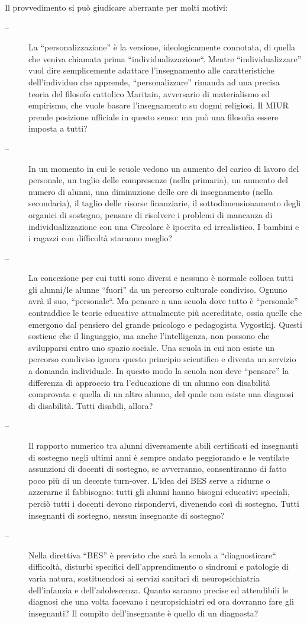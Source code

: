 Il provvedimento si può giudicare aberrante per molti motivi:
\begin{description}
\item[--]  La “personalizzazione” è la versione, ideologicamente connotata, di quella che veniva chiamata prima “individualizzazione“. Mentre “individualizzare” vuol dire semplicemente adattare l'insegnamento alle caratteristiche dell'individuo che apprende, “personalizzare” rimanda ad una precisa teoria del filosofo cattolico Maritain, avversario di materialismo ed empirismo, che vuole basare l'insegnamento su dogmi religiosi. Il MIUR prende posizione ufficiale in questo senso: ma può una filosofia essere imposta a tutti?
\item[--] In un momento in cui le scuole vedono un aumento del carico di lavoro del personale, un taglio delle compresenze (nella primaria), un aumento del numero di alunni, una diminuzione delle ore di insegnamento (nella secondaria), il taglio delle risorse finanziarie, il sottodimensionamento degli organici di sostegno, pensare di risolvere i problemi di mancanza di individualizzazione con una Circolare è ipocrita ed irrealistico. I bambini e i ragazzi con difficoltà staranno meglio?

\item[--]La concezione per cui tutti sono diversi e nessuno è normale colloca tutti gli alunni/le alunne “fuori” da un percorso culturale condiviso. Ognuno avrà il suo, “personale“. Ma pensare a una scuola dove tutto è “personale” contraddice le teorie educative attualmente più accreditate, ossia quelle che emergono dal pensiero del grande psicologo e pedagogista Vygostkij. Questi sostiene che il linguaggio, ma anche l'intelligenza, non possono che svilupparsi entro uno spazio sociale. Una scuola in cui non esiste un percorso condiviso ignora questo principio scientifico e diventa un servizio a domanda individuale. In questo modo la scuola non deve “pensare” la differenza di approccio tra l'educazione di un alunno con disabilità comprovata e quella di un altro alunno, del quale non esiste una diagnosi di disabilità. Tutti disabili, allora?

\item[--]Il rapporto numerico tra alunni diversamente abili certificati ed insegnanti di sostegno negli ultimi anni è sempre andato peggiorando e le ventilate assunzioni di docenti di sostegno, se avverranno, consentiranno di fatto poco più di un decente turn-over. L'idea dei BES serve a ridurne o azzerarne il fabbisogno: tutti gli alunni hanno bisogni educativi speciali, perciò tutti i docenti devono rispondervi, divenendo così di sostegno. Tutti insegnanti di sostegno, nessun insegnante di sostegno?

\item[--]Nella direttiva “BES” è previsto che sarà la scuola a “diagnosticare“ difficoltà, disturbi specifici dell'apprendimento o sindromi e patologie di varia natura, sostituendosi ai servizi sanitari di neuropsichiatria dell'infanzia e dell'adolescenza. Quanto saranno precise ed attendibili le diagnosi che una volta facevano i neuropsichiatri ed ora dovranno fare gli insegnanti? Il compito dell'insegnante è quello di un diagnosta?

\end{description}
